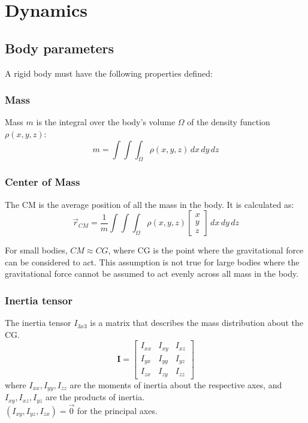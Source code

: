 \chapter{Dynamics}
\section{Body parameters}
A rigid body must have the following properties defined:

\subsection{Mass}
Mass \( m \) is the integral over the body's volume \( \Omega \) of the density function \( \rho(x,y,z) \):
\begin{equation} \nonumber
    m = \int\int\int_\Omega \rho(x,y,z) \, dx \, dy \, dz
\end{equation}

\subsection{Center of Mass}
The CM is the average position of all the mass in the body. It is calculated as:
\begin{equation} \nonumber
    \vec{r}_{CM} = \frac{1}{m} \int\int\int_\Omega \rho(x,y,z)
    \begin{bmatrix}
        x \\ y \\ z
    \end{bmatrix}
    \, dx \, dy \, dz
\end{equation}

For small bodies, \(CM \approx CG\), where CG is the point where the gravitational force can be considered to act. This assumption is not true for large bodies where the gravitational force cannot be assumed to act evenly across all mass in the body.

\subsection{Inertia tensor}
The inertia tensor \(I_{3x3}\) is a matrix that describes the mass distribution about the CG.
\begin{equation} \nonumber
    \mathbf{I} = \begin{bmatrix}
        I_{xx} & I_{xy} & I_{xz} \\
        I_{yx} & I_{yy} & I_{yz} \\
        I_{zx} & I_{zy} & I_{zz}
    \end{bmatrix}
\end{equation}
where \( I_{xx}, I_{yy}, I_{zz} \) are the moments of inertia about the respective axes, and \( I_{xy}, I_{xz}, I_{yz} \) are the products of inertia. \\
\((I_{xy}, I_{yz}, I_{zx}) = \vec{0}\) for the principal axes. \\

